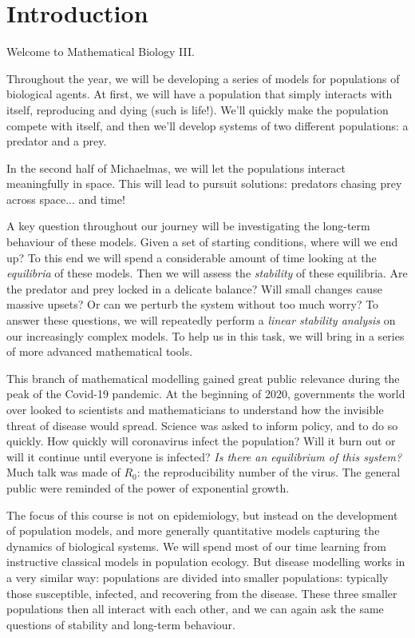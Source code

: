 \documentclass[main.tex]{subfiles}
\begin{document}
\setcounter{chapter}{-1}
\chapter{Introduction}
Welcome to Mathematical Biology III.

Throughout the year, we will be developing a series of models for populations of biological agents. At first, we will have a population that simply interacts with itself, reproducing and dying (such is life!). We'll quickly make the population compete with itself, and then we'll develop systems of two different populations: a predator and a prey.  

In the second half of Michaelmas, we will let the populations interact meaningfully in space. This will lead to pursuit solutions: predators chasing prey across space... and time!

A key question throughout our journey will be investigating the long-term behaviour of these models. Given a set of starting conditions, where will we end up? To this end we will spend a considerable amount of time looking at the \emph{equilibria} of these models. Then we will assess the \emph{stability} of these equilibria. Are the predator and prey locked in a delicate balance? Will small changes cause massive upsets? Or can we perturb the system without too much worry? To answer these questions, we will repeatedly perform a \emph{linear stability analysis} on our increasingly complex models. To help us in this task, we will bring in a series of more advanced mathematical tools.

This branch of mathematical modelling gained great public relevance during the peak of the Covid-19 pandemic. At the beginning of 2020, governments the world over looked to scientists and mathematicians to understand how the invisible threat of disease would spread. Science was asked to inform policy, and to do so quickly. How quickly will coronavirus infect the population? Will it burn out or will it continue until everyone is infected? \emph{Is there an equilibrium of this system?} Much talk was made of $R_0$: the reproducibility number of the virus. The general public were reminded of the power of exponential growth.

The focus of this course is not on epidemiology, but instead on the development of population models, and more generally quantitative models capturing the dynamics of biological systems. We will spend most of our time learning from instructive classical models in population ecology. But disease modelling works in a very similar way: populations are divided into smaller populations: typically those susceptible, infected, and recovering from the disease. These three smaller populations then all interact with each other, and we can again ask the same questions of stability and long-term behaviour.
\end{document}

